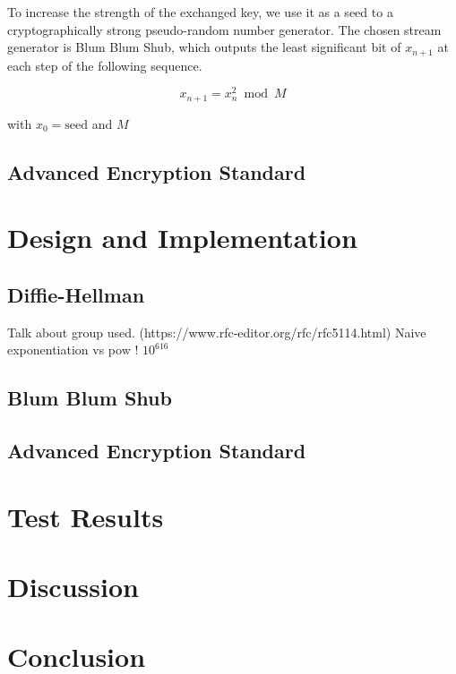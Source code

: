 \documentclass{article}
\begin{document}
To increase the strength of the exchanged key, we use it as a seed to a cryptographically strong pseudo-random number generator. The chosen stream generator is Blum Blum Shub, which outputs the least significant bit of $x_{{n+1}}$ at each step of the following sequence.

\begin{equation*}
    x_{n+1}=x_{n}^{2} \bmod M
\end{equation*}

with $x_{0} = \text{seed}$ and $M$


\subsection{Advanced Encryption Standard}



\section{Design and Implementation}

\subsection{Diffie-Hellman}
Talk about group used. (https://www.rfc-editor.org/rfc/rfc5114.html)
Naive exponentiation vs pow !
$10^{616}$

\subsection{Blum Blum Shub}

\subsection{Advanced Encryption Standard}


\section{Test Results}
\section{Discussion}
\section{Conclusion}





\end{document}
